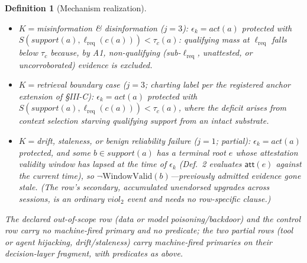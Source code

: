 \documentclass[conference]{IEEEtran}
\newtheorem{definition}{Definition}
\providecommand{\tc}{\tau_{c}}
\newcommand{\att}{\ensuremath{\mathsf{att}}}
\newcommand{\lreq}{\ensuremath{\ell_{\mathrm{req}}}}
\begin{document}
\begin{definition}[Mechanism realization]
\begin{itemize}
endorsement on a belief depending on tool-result-channel content
(tool-sourced content laundered above its ingress label).
\item $K = {}$misinformation \& disinformation ($j = 3$):
$\epsilon_k = \mathit{act}(a)$ protected with
$S(\mathit{support}(a), \lreq(c(a))) < \tc(a)$: qualifying mass at
$\lreq$ falls below $\tc$ because, by A1, non-qualifying
(sub-$\lreq$, unattested, or uncorroborated) evidence is excluded.
\item $K = {}$retrieval boundary case ($j = 3$; charting label per the
registered anchor extension of \S III-C): $\epsilon_k =
\mathit{act}(a)$ protected with $S(\mathit{support}(a), \lreq(c(a)))
< \tc(a)$, where the deficit arises from context selection starving
qualifying support from an intact substrate.
\item $K = {}$drift, staleness, or benign reliability failure
($j = 1$; partial): $\epsilon_k = \mathit{act}(a)$ protected, and
some $b \in \mathit{support}(a)$ has a terminal root $e$ whose
attestation validity window has lapsed at the time of $\epsilon_k$
(Def.~2 evaluates $\att(e)$ against the current time), so
$\neg\mathrm{WindowValid}(b)$---previously admitted evidence gone
stale. (The row's secondary, accumulated unendorsed upgrades across
sessions, is an ordinary $\mathit{viol}_2$ event and needs no
row-specific clause.)
\end{itemize}
The declared out-of-scope row (data or model poisoning/backdoor) and
the control row carry no machine-fired primary and no predicate; the
two partial rows (tool or agent hijacking, drift/staleness) carry
machine-fired primaries on their decision-layer fragment, with
predicates as above.
\end{definition}
\end{document}
